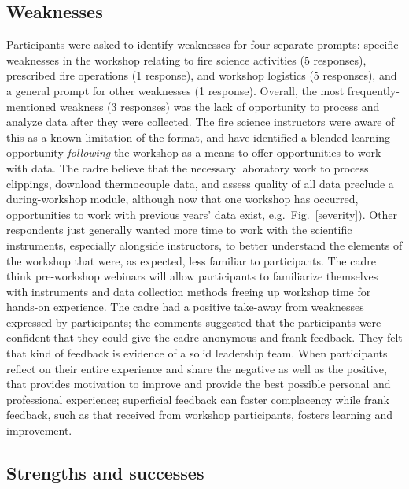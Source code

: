 \documentclass[fire,article,submit,moreauthors,pdftex]{Definitions/mdpi}
\begin{document}
\subsection{Weaknesses}

Participants were asked to identify weaknesses for four separate prompts: specific weaknesses in the workshop relating to fire science activities (5 responses), prescribed fire operations (1 response), and workshop logistics (5 responses), and a general prompt for other weaknesses (1 response).
Overall, the most frequently-mentioned weakness (3 responses) was the lack of opportunity to process and analyze data after they were collected.
The fire science instructors were aware of this as a known limitation of the format, and have identified a blended learning opportunity \emph{following} the workshop as a means to offer opportunities to work with data.
The cadre believe that the necessary laboratory work to process clippings, download thermocouple data, and assess quality of all data preclude a during-workshop module, although now that one workshop has occurred, opportunities to work with previous years' data exist, e.g.~Fig.~\ref{severity}).
Other respondents just generally wanted more time to work with the scientific instruments, especially alongside instructors, to better understand the elements of the workshop that were, as expected, less familiar to participants.
The cadre think pre-workshop webinars will allow participants to familiarize themselves with instruments and data collection methods freeing up workshop time for hands-on experience. 
The cadre had a positive take-away from weaknesses expressed by participants; the comments suggested that the participants were confident that they could give the cadre anonymous and frank feedback.
They felt that kind of feedback is evidence of a solid leadership team. 
When participants reflect on their entire experience and share the negative as well as the positive, that provides motivation to improve and provide the best possible personal and professional experience; superficial feedback can foster complacency while frank feedback, such as that received from workshop participants, fosters learning and improvement. 

\subsection{Strengths and successes}
\end{document}
